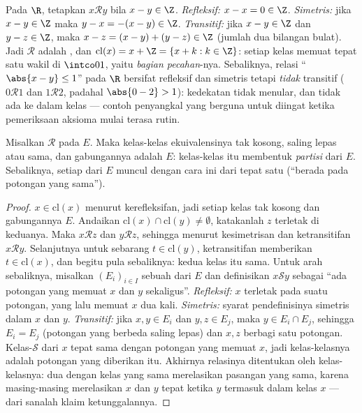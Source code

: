 \begin{example}\label{ex:b1:logic:fracpart}
Pada $\R$, tetapkan $x \mathbin{\mathcal{R}} y$ bila $x - y \in \Z$.
\emph{Refleksif:} $x - x = 0 \in \Z$. \emph{Simetris:} jika $x - y
\in \Z$ maka $y - x = -(x - y) \in \Z$. \emph{Transitif:} jika $x -
y \in \Z$ dan $y - z \in \Z$, maka $x - z = (x - y) + (y - z) \in
\Z$ (jumlah dua bilangan bulat). Jadi $\mathcal R$ adalah , dan $\mathrm{cl}(x) = x + \Z = \{x + k : k \in \Z\}$:
setiap kelas memuat tepat satu wakil di $\intco01$, yaitu
\emph{bagian pecahan}-nya. Sebaliknya, relasi ``$\abs{x - y}
\leq 1$'' pada $\R$ bersifat refleksif dan simetris tetapi
\emph{tidak} transitif ($0 \mathbin{\mathcal R} 1$ dan
$1 \mathbin{\mathcal R}
2$, padahal $\abs{0 - 2} > 1$): kedekatan tidak menular, dan tidak ada
 ke dalam kelas --- contoh penyangkal yang berguna untuk
diingat ketika pemeriksaan aksioma mulai terasa rutin.
\end{example}

\begin{theorem}\label{thm:b1:logic:partition}
Misalkan $\mathcal{R}$  pada $E$. Maka kelas-kelas
ekuivalensinya tak kosong, saling lepas atau sama, dan gabungannya
adalah $E$: kelas-kelas itu membentuk \emph{partisi}
dari $E$. Sebaliknya, setiap  dari $E$ muncul dengan cara ini
dari tepat satu  (``berada pada potongan yang sama'').
\end{theorem}

\begin{proof}
$x \in \mathrm{cl}(x)$ menurut kerefleksifan, jadi setiap kelas tak
kosong dan gabungannya $E$. Andaikan
$\mathrm{cl}(x) \cap \mathrm{cl}(y) \neq \emptyset$, katakanlah $z$
terletak di keduanya. Maka $x \mathbin{\mathcal{R}} z$ dan $y
\mathbin{\mathcal{R}} z$, sehingga menurut kesimetrisan dan
ketransitifan $x
\mathbin{\mathcal{R}} y$. Selanjutnya untuk sebarang
$t \in \mathrm{cl}(y)$, ketransitifan memberikan
$t \in \mathrm{cl}(x)$, dan begitu pula sebaliknya: kedua
kelas itu sama. Untuk arah sebaliknya, misalkan $(E_i)_{i \in I}$
sebuah  dari $E$ dan definisikan $x \mathbin{\mathcal S} y$
sebagai ``ada potongan yang memuat $x$ dan $y$ sekaligus''.
\emph{Refleksif:} $x$ terletak pada suatu potongan, yang lalu memuat
$x$ dua kali. \emph{Simetris:} syarat pendefinisinya simetris dalam
$x$ dan $y$. \emph{Transitif:} jika $x, y \in E_i$ dan
$y, z \in E_j$, maka $y \in E_i \cap E_j$, sehingga $E_i = E_j$
(potongan yang berbeda saling lepas) dan $x, z$ berbagi satu potongan.
Kelas-$\mathcal S$ dari $x$ tepat sama dengan potongan yang memuat
$x$, jadi kelas-kelasnya adalah potongan yang diberikan itu. Akhirnya
relasinya ditentukan oleh kelas-kelasnya: dua 
dengan kelas yang sama merelasikan pasangan yang sama, karena
masing-masing merelasikan $x$ dan $y$ tepat ketika $y$ termasuk dalam
kelas $x$ --- dari sanalah klaim ketunggalannya.
\end{proof}

